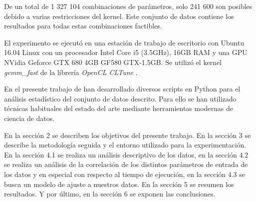 De un total de 1 327 104 combinaciones de parámetros, solo 241 600 son posibles debido a varias restricciones del kernel. Este conjunto de datos contiene los resultados para todas estas combinaciones factibles. 

El experimento se ejecutó en una estación de trabajo de escritorio con Ubuntu 16.04 Linux con un procesador Intel Core i5 (3.5GHz), 16GB RAM y una GPU NVidia Geforce GTX 680 4GB GF580 GTX-1.5GB. Se utilizó el kernel \textit{gemm\_fast} de la librería \textit{OpenCL CLTune} \citep{cltune}.

En el presente trabajo de han desarrollado diversos scripts en Python para el análisis estadístico del conjunto de datos descrito. Para ello se han utilizado técnicas habituales del estado del arte\citep{Montgomery1996} mediante herramientas modernas de ciencia de datos\citep{vanderplas2016python}. 

En la sección 2 se describen los objetivos del presente trabajo. En la sección 3 se describe la metodología seguida y el entorno utilizado para la experimentación. En la sección 4.1 se realiza un análisis descriptivo de los datos, en la sección 4.2 se realiza un análisis de la correlación de los distintos parámetros de entrada de los datos y en especial con respecto al tiempo de ejecución, en la sección 4.3 se busca un modelo de ajuste a nuestros datos. En la sección 5 se resumen los resultados. Y por último, en la sección 6 se exponen las conclusiones.